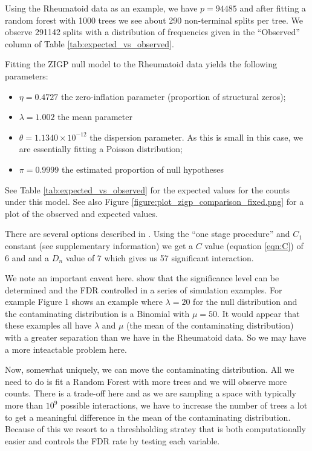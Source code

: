 \documentclass[authoryear,preprint,12pt,3p]{elsarticle}
\begin{document}
Using the Rheumatoid data as an example, we have $p= 94485$ and after fitting a random forest with
1000 trees we see about 290 non-terminal splits per tree. We observe 291142 splits with a distribution of frequencies
given in the ``Observed'' column of Table \ref{tab:expected_vs_observed}.



Fitting the ZIGP null model to the Rheumatoid data yields the following parameters:
\begin{itemize}
\item $\eta= 0.4727$    the zero-inflation parameter (proportion of structural zeros);
\item $\lambda= 1.002$   the mean parameter
\item $\theta= 1.1340\times 10^{-12}$   the dispersion parameter. As this is small in this case, we are essentially
  fitting a Poisson distribution;
\item $\pi= 0.9999$  the estimated proportion of null hypotheses
\end{itemize}

See Table \ref{tab:expected_vs_observed} for the expected values for the counts under this model. See also Figure
\ref{figure:plot_zigp_comparison_fixed.png} for a plot of the observed and expected values.

There are several options described in  \cite{Gauran.et.al.2018}.
Using the ``one stage procedure'' and $C_1$ constant (see supplementary information)
we get a $C$ value (equation \ref{eqn:C}) of 6 and and a $D_n$ value of 7 which gives us 57 significant interaction.

We note an important caveat here.  \cite{Gauran.et.al.2018} show that the significance level can be
determined and the FDR controlled in a series of simulation examples. For example  Figure 1 \cite[]{Gauran.et.al.2018}
shows an example where $\lambda =20$ for the null distribution and the contaminating distribution is a Binomial with
$\mu=50.$ It would appear that these examples all have $\lambda$ and $\mu$ (the mean of the contaminating distribution) with a
greater separation than we have in the Rheumatoid data. So we may have a more inteactable problem here.

Now, somewhat uniquely, we can move the contaminating distribution. All we need to do is fit a Random Forest with more
trees and we will observe more counts.
There is a trade-off here and as we are sampling a space with typically more than $10^{9}$ possible interactions,
we have to increase the number of trees a lot to get a meaningful difference in the mean of the contaminating
distribution. Because of this we resort to a threshholding stratey that is both computationally easier and controls the FDR rate by testing
each variable.
\end{document}
